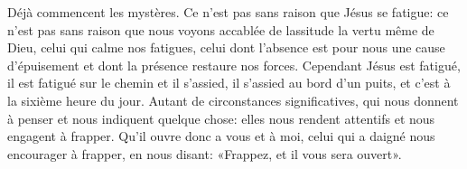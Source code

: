 Déjà commencent les mystères.
Ce n’est pas sans raison que Jésus se fatigue:
	ce n’est pas sans raison
		que nous voyons accablée de lassitude la vertu même de Dieu,
	celui qui calme nos fatigues,
	celui dont l’absence est pour nous une cause d’épuisement
	et dont la présence restaure nos forces.
Cependant Jésus est fatigué,
	il est fatigué sur le chemin et il s’assied,
	il s’assied au bord d’un puits,
	et c’est à la sixième heure du jour.
Autant de circonstances significatives,
	qui nous donnent à penser et nous indiquent quelque chose:
	elles nous rendent attentifs et nous engagent à frapper.
Qu’il ouvre donc a vous et à moi, celui qui a daigné nous encourager à frapper,
	en nous disant: «Frappez, et il vous sera ouvert».
